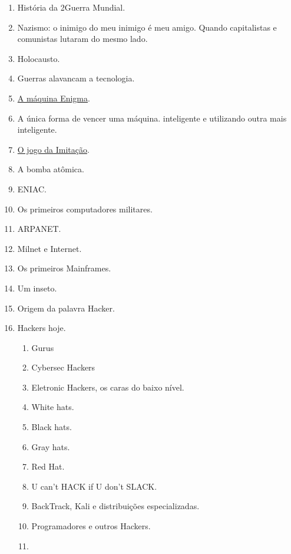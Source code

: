 \begin{multicols}{2}
\begin{enumerate}
	\item História da 2\textordfeminine\space Guerra Mundial.
	\item Nazismo: o inimigo do meu inimigo é meu amigo. Quando capitalistas e comunistas lutaram do mesmo lado.
	\item Holocausto.
	\item Guerras alavancam a tecnologia.
	\item \href{https://pt.wikipedia.org/wiki/Enigma\_(m%C3%A1quina)}{A máquina Enigma}.
	\item A única forma de vencer uma máquina. inteligente e utilizando outra mais inteligente.
	\item \href{https://youtu.be/mwFWMM9APLs?t=170}{O jogo da Imitação}.
	\item A bomba atômica.
	\item ENIAC.
	\item Os primeiros computadores militares.
	\item ARPANET.
	\item Milnet e Internet.
	\item Os primeiros Mainframes.
	\item Um inseto.
	\item Origem da palavra Hacker.
	\item Hackers hoje.
	\begin{enumerate}
		\item Gurus
		\item Cybersec Hackers
		\item Eletronic Hackers, os caras do baixo nível.
		\item White hats.
		\item Black hats.
		\item Gray hats.
		\item Red Hat.
		\item U can't HACK if U don't SLACK.
		\item BackTrack, Kali e distribuições especializadas.
		\item Programadores e outros Hackers.
\item
	\end{enumerate}
\end{enumerate}

\end{multicols}